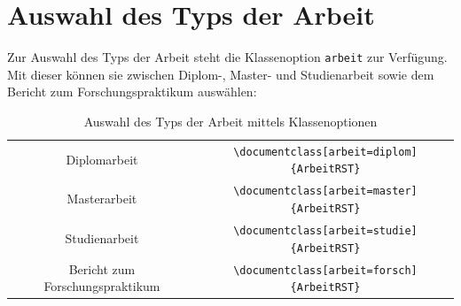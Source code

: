 \section{Auswahl des Typs der Arbeit}
Zur Auswahl des Typs der Arbeit steht die Klassenoption \texttt{arbeit} zur Verfügung. Mit dieser können sie zwischen Diplom-, Master- und Studienarbeit sowie dem Bericht zum Forschungspraktikum auswählen:
\begin{table}[hbtp]%
\caption{Auswahl des Typs der Arbeit mittels Klassenoptionen}
\centering
\begin{tabular}{cc}
Diplomarbeit & \verb|\documentclass[arbeit=diplom]{ArbeitRST}|\\
Masterarbeit & \verb|\documentclass[arbeit=master]{ArbeitRST}|\\
Studienarbeit & \verb|\documentclass[arbeit=studie]{ArbeitRST}|\\
Bericht zum Forschungspraktikum & \verb|\documentclass[arbeit=forsch]{ArbeitRST}|
\end{tabular}
\label{}
\end{table}



